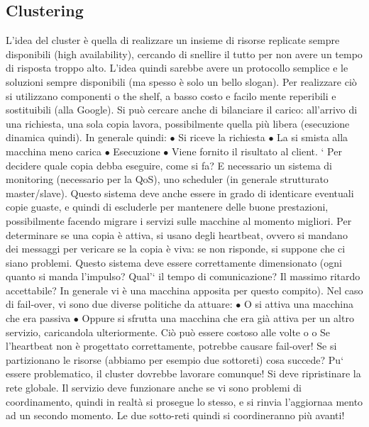 \subsection{Clustering}
L'idea del cluster è quella di realizzare un insieme di risorse replicate sempre
disponibili (high availability), cercando di snellire il tutto per non avere un tempo di risposta troppo alto. L'idea
quindi sarebbe avere un protocollo semplice
e le soluzioni sempre disponibili (ma spesso è solo un bello slogan).
Per realizzare ciò si utilizzano componenti o the shelf, a basso costo e facilo
mente reperibili e sostituibili (alla Google). Si può cercare anche di bilanciare
il carico: all'arrivo di una richiesta, una sola copia lavora, possibilmente quella
più libera (esecuzione dinamica quindi). In generale quindi:
$\bullet$ Si riceve la richiesta
$\bullet$ La si smista alla macchina meno carica
$\bullet$ Esecuzione
$\bullet$ Viene fornito il risultato al client.
`
Per decidere quale copia debba eseguire, come si fa? E necessario un sistema
di monitoring (necessario per la QoS), uno scheduler (in generale strutturato
master/slave). Questo sistema deve anche essere in grado di identicare eventuali copie guaste, e quindi di escluderle
per mantenere delle buone prestazioni,
possibilmente facendo migrare i servizi sulle macchine al momento migliori. Per
determinare se una copia è attiva, si usano degli heartbeat, ovvero si mandano
dei messaggi per vericare se la copia è viva: se non risponde, si suppone che
ci siano problemi. Questo sistema deve essere correttamente dimensionato (ogni quanto si manda l'impulso? Qual'` il
tempo di comunicazione? Il massimo
ritardo accettabile? In generale vi è una macchina apposita per questo compito).
Nel caso di fail-over, vi sono due diverse politiche da attuare:
$\bullet$ O si attiva una macchina che era passiva
$\bullet$ Oppure si sfrutta una macchina che era già attiva per un altro servizio,
caricandola ulteriormente. Ciò può essere costoso alle volte
o o
Se l'heartbeat non è progettato correttamente, potrebbe causare fail-over!
Se si partizionano le risorse (abbiamo per esempio due sottoreti) cosa succede? Pu` essere problematico, il cluster
dovrebbe lavorare comunque! Si deve
ripristinare la rete globale. Il servizio deve funzionare anche se vi sono problemi
di coordinamento, quindi in realtà si prosegue lo stesso, e si rinvia l'aggiornaa
mento ad un secondo momento. Le due sotto-reti quindi si coordineranno più
avanti!

